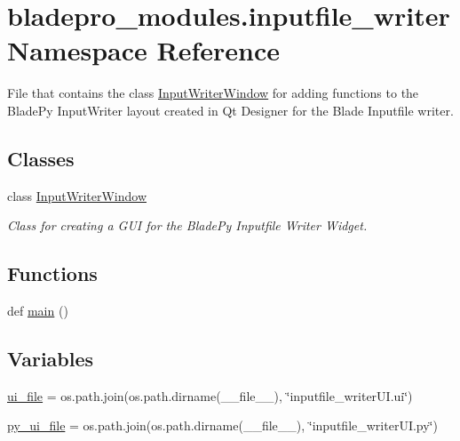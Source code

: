 \hypertarget{namespacebladepro__modules_1_1inputfile__writer}{}\section{bladepro\+\_\+modules.\+inputfile\+\_\+writer Namespace Reference}
\label{namespacebladepro__modules_1_1inputfile__writer}


File that contains the class \hyperlink{classbladepro__modules_1_1inputfile__writer_1_1_input_writer_window}{Input\+Writer\+Window} for adding functions to the Blade\+Py Input\+Writer layout created in Qt Designer for the Blade Inputfile writer.  


\subsection*{Classes}
\begin{DoxyCompactItemize}
\item 
class \hyperlink{classbladepro__modules_1_1inputfile__writer_1_1_input_writer_window}{Input\+Writer\+Window}
\begin{DoxyCompactList}\small\item\em Class for creating a G\+UI for the Blade\+Py Inputfile Writer Widget. \end{DoxyCompactList}\end{DoxyCompactItemize}
\subsection*{Functions}
\begin{DoxyCompactItemize}
\item 
def \hyperlink{namespacebladepro__modules_1_1inputfile__writer_af7196fb030213564f7a096e5437b03c6}{main} ()
\end{DoxyCompactItemize}
\subsection*{Variables}
\begin{DoxyCompactItemize}
\item 
\hyperlink{namespacebladepro__modules_1_1inputfile__writer_a1b76e57504b8ccc9af88c21882fd995f}{ui\+\_\+file} = os.\+path.\+join(os.\+path.\+dirname(\+\_\+\+\_\+file\+\_\+\+\_\+), \char`\"{}inputfile\+\_\+writer\+U\+I.\+ui\char`\"{})
\item 
\hyperlink{namespacebladepro__modules_1_1inputfile__writer_ad7ae10efada37c5353710ada1cb4b756}{py\+\_\+ui\+\_\+file} = os.\+path.\+join(os.\+path.\+dirname(\+\_\+\+\_\+file\+\_\+\+\_\+), \char`\"{}inputfile\+\_\+writer\+U\+I.\+py\char`\"{})
\end{DoxyCompactItemize}


